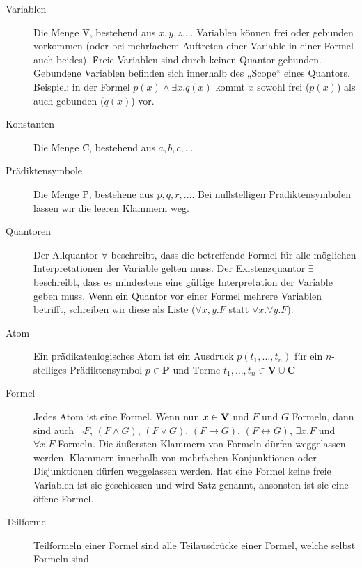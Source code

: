     \begin{description}
        \item[Variablen] Die Menge \f{V}, bestehend aus $x, y, z\dots$. Variablen können frei oder gebunden vorkommen (oder bei mehrfachem Auftreten einer Variable in einer Formel auch beides). \f{Freie} Variablen sind durch keinen Quantor gebunden. \f{Gebundene} Variablen befinden sich innerhalb des „Scope“ eines Quantors. Beispiel: in der Formel $p(x) \land \exists x.q(x)$ kommt $x$ sowohl frei ($p(x)$) als auch gebunden ($q(x)$) vor.

        \item[Konstanten] Die Menge \f{C}, bestehend aus $a,b,c,\dots${}

        \item[Prädiktensymbole] Die Menge \f{P}, bestehene aus $p,q,r,\dots${}. Bei nullstelligen Prädiktensymbolen lassen wir die leeren Klammern weg.

        \item[Quantoren] Der Allquantor $\forall$ beschreibt, dass die betreffende Formel für alle möglichen Interpretationen der Variable gelten muss. Der Existenzquantor $\exists$ beschreibt, dass es mindestens eine gültige Interpretation der Variable geben muss. Wenn ein Quantor vor einer Formel mehrere Variablen betrifft, schreiben wir diese als Liste ($\forall x,y.F$ statt $\forall x.\forall y.F$).

        \item[Atom] Ein prädikatenlogisches Atom ist ein Ausdruck $p(t_{1},\dots,t_{n})$ für ein $n$-stelliges Prädiktensymbol $p \in \mathbf{P}$ und \f{Terme} $t_{1},\dots,t_{n} \in \mathbf{V} \cup \mathbf{C}$

        \item[Formel] Jedes Atom ist eine Formel. Wenn nun $x\in\textbf{V}$ und $F$ und $G$ Formeln, dann sind auch $\neg F$, $(F\land G)$, $(F\lor G)$, $(F\to G)$, $(F\leftrightarrow G)$, $\exists x.F$ und $\forall x.F$ Formeln. Die äußersten Klammern von Formeln dürfen weggelassen werden. Klammern innerhalb von mehrfachen Konjunktionen oder Disjunktionen dürfen weggelassen werden. Hat eine Formel keine freie Variablen ist sie \f{geschlossen} und wird \f{Satz} genannt, ansonsten ist sie eine \f{offene} Formel.

        \item[Teilformel] Teilformeln einer Formel sind alle Teilausdrücke einer Formel, welche selbst Formeln sind.
    \end{description}



